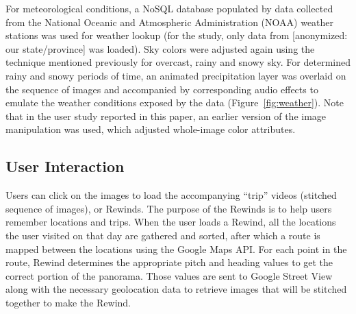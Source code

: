 \documentclass{sigchi}
\begin{document}
For meteorological conditions, a NoSQL database populated by data collected from the National Oceanic and Atmospheric Administration (NOAA) weather stations was used for weather lookup (for the study, only data from [anonymized: our state/province] was loaded). Sky colors were adjusted again using the technique mentioned previously for overcast, rainy and snowy sky. For determined rainy and snowy periods of time, an animated precipitation layer was overlaid on the sequence of images and accompanied by corresponding audio effects to emulate the weather conditions exposed by the data (Figure~\ref{fig:weather}). Note that in the user study reported in this paper, an earlier version of the image manipulation was used, which adjusted whole-image color attributes.


\subsection{User Interaction}
Users can click on the images to load the accompanying ``trip'' videos (stitched sequence of images), or Rewinds. The purpose of the Rewinds is to help users remember locations and trips.
When the user loads a Rewind, all the locations the user visited on that day are gathered and sorted, after which a route is mapped between the locations using the Google Maps API.
For each point in the route, Rewind determines the appropriate pitch and heading values to get the correct portion of the panorama. Those values are sent to Google Street View along with the necessary geolocation data to retrieve images that will be stitched together to make the Rewind.
\end{document}
